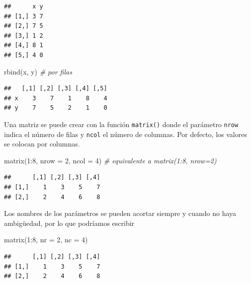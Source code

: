 \documentclass[
]{book}
\newenvironment{Shaded}{\begin{snugshade}}{\end{snugshade}}
\newcommand{\AttributeTok}[1]{\textcolor[rgb]{0.77,0.63,0.00}{#1}}
\newcommand{\CommentTok}[1]{\textcolor[rgb]{0.56,0.35,0.01}{\textit{#1}}}
\newcommand{\DecValTok}[1]{\textcolor[rgb]{0.00,0.00,0.81}{#1}}
\newcommand{\FunctionTok}[1]{\textcolor[rgb]{0.00,0.00,0.00}{#1}}
\newcommand{\NormalTok}[1]{#1}
\newcommand{\SpecialCharTok}[1]{\textcolor[rgb]{0.00,0.00,0.00}{#1}}
\theoremstyle{break}
\theoremstyle{nonumberplain}
\begin{document}
\begin{verbatim}
##      x y
## [1,] 3 7
## [2,] 7 5
## [3,] 1 2
## [4,] 8 1
## [5,] 4 0
\end{verbatim}

\begin{Shaded}
\begin{Highlighting}[]
\FunctionTok{rbind}\NormalTok{(x, y)  }\CommentTok{\# por filas}
\end{Highlighting}
\end{Shaded}

\begin{verbatim}
##   [,1] [,2] [,3] [,4] [,5]
## x    3    7    1    8    4
## y    7    5    2    1    0
\end{verbatim}

Una matriz se puede crear con la función \texttt{matrix()} donde el parámetro \texttt{nrow} indica el número de filas y \texttt{ncol} el número de columnas.
Por defecto, los valores se colocan por columnas.

\begin{Shaded}
\begin{Highlighting}[]
\FunctionTok{matrix}\NormalTok{(}\DecValTok{1}\SpecialCharTok{:}\DecValTok{8}\NormalTok{, }\AttributeTok{nrow =} \DecValTok{2}\NormalTok{, }\AttributeTok{ncol =} \DecValTok{4}\NormalTok{)  }\CommentTok{\# equivalente a matrix(1:8, nrow=2)}
\end{Highlighting}
\end{Shaded}

\begin{verbatim}
##      [,1] [,2] [,3] [,4]
## [1,]    1    3    5    7
## [2,]    2    4    6    8
\end{verbatim}

Los nombres de los parámetros se pueden acortar siempre y cuando no haya ambigüedad, por lo que podríamos escribir

\begin{Shaded}
\begin{Highlighting}[]
\FunctionTok{matrix}\NormalTok{(}\DecValTok{1}\SpecialCharTok{:}\DecValTok{8}\NormalTok{, }\AttributeTok{nr =} \DecValTok{2}\NormalTok{, }\AttributeTok{nc =} \DecValTok{4}\NormalTok{)}
\end{Highlighting}
\end{Shaded}

\begin{verbatim}
##      [,1] [,2] [,3] [,4]
## [1,]    1    3    5    7
## [2,]    2    4    6    8
\end{verbatim}
\end{document}
